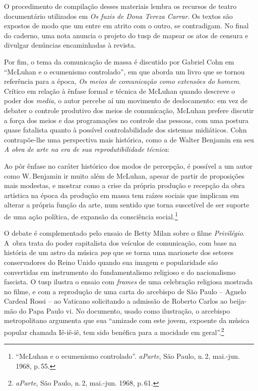 O procedimento de compilação desses materiais lembra os recursos de
teatro documentário utilizados em {\it Os fuzis de Dona Tereza Carrar}.
Os textos são expostos de modo que um entre em atrito com o outro,
se contradigam. No final do caderno, uma nota anuncia o projeto do
{\sc tusp} de mapear os atos de censura e divulgar denúncias encaminhadas à
revista.

Por fim, o tema da comunicação de massa é discutido por Gabriel Cohn em
“McLuhan e o ecumenismo controlado”, em que aborda um
livro que se tornou referência para a época, {\it Os meios de comunicação como extensões do homem}.
Crítico em relação à ênfase formal e técnica de McLuhan quando descreve
o poder dos {\it media}, o autor percebe aí um movimento de
deslocamento: em vez de debater o controle produtivo dos meios de
comunicação, McLuhan prefere discutir a força dos meios e das
programações no controle das pessoas, com uma postura quase fatalista
quanto à possível controlabilidade dos sistemas midiáticos. Cohn
contrapõe-lhe uma perspectiva mais histórica, como a de Walter
Benjamin em seu {\it A obra de arte na era de sua reprodutibilidade
técnica}:

\startblockquote
Ao pôr ênfase no caráter histórico dos modos de percepção, é possível a
um autor como W.\,Benjamin ir muito além de McLuhan, apesar de partir de
proposições mais modestas, e mostrar como a crise da própria produção e
recepção da obra artística na época da produção em massa tem raízes
sociais que implicam em alterar a própria função da arte, num sentido
que torna suscetível de ser suporte de uma ação política, de expansão da
consciência social.\footnote{“McLuhan e o ecumenismo controlado”.
  {\it aParte}, São Paulo, n.\,2, mai.-jun. 1968, p.\,55.}
\stopblockquote

O debate é complementado pelo ensaio de Betty Milan
sobre o filme {\it Privilégio}. A~obra trata do poder capitalista dos
veículos de comunicação, com base na história de um astro da música
{\it pop} que se torna uma marionete dos setores conservadores do Reino
Unido quando sua imagem e popularidade são convertidas em instrumento do
fundamentalismo religioso e do nacionalismo fascista. O {\sc tusp} ilustra o
ensaio com {\it frames} de uma celebração religiosa mostrada no filme, e
com a reprodução de uma carta do arcebispo de São Paulo -- Agnelo Cardeal
Rossi -- ao Vaticano solicitando a admissão de Roberto Carlos ao
beija-mão do Papa Paulo {\sc vi}. No documento, usado como ilustração, o
arcebispo metropolitano argumenta que sua “amizade com este jovem,
expoente da música popular chamada Iê-iê-iê, tem sido benéfica para a
mocidade em geral”.\footnote{{\it aParte}, São Paulo, n.\,2, mai.-jun.
  1968, p.\,61.}

